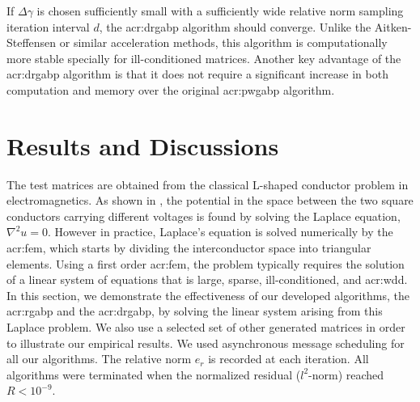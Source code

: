 If $\Delta\gamma$ is chosen sufficiently small with a sufficiently wide relative norm sampling iteration interval $d$, the \gls{acr:drgabp} algorithm should converge.
Unlike the Aitken-Steffensen or similar acceleration methods, this algorithm is computationally more stable specially for ill-conditioned matrices.
Another key advantage of the \gls{acr:drgabp} algorithm is that it does not require a significant increase in both computation and memory over the original \gls{acr:pwgabp} algorithm. 


\section{Results and Discussions}
\label{sec:argabpResults}

The test matrices are obtained from the classical L-shaped conductor problem in electromagnetics.
As shown in , the potential in the space between the two square conductors carrying different voltages is found by solving the Laplace equation, $ \nabla^2 u = 0 $.
However in practice, Laplace's equation is solved numerically by the \gls{acr:fem}, which starts by dividing the interconductor space into triangular elements.
Using a first order \gls{acr:fem},  the problem typically requires the solution of a linear system of equations that is large, sparse, ill-conditioned, and \gls{acr:wdd}.
In this section, we demonstrate the effectiveness of our developed algorithms, the \gls{acr:rgabp} and the \gls{acr:drgabp}, by solving the linear system arising from this Laplace problem.
We also use a selected set of other generated matrices in order to illustrate our empirical results.
We used asynchronous message scheduling for all our algorithms.
The relative norm $e_r$ is recorded at each iteration.
All algorithms were terminated when the normalized residual ($l^2$-norm) reached $R < 10^{-9}$.

